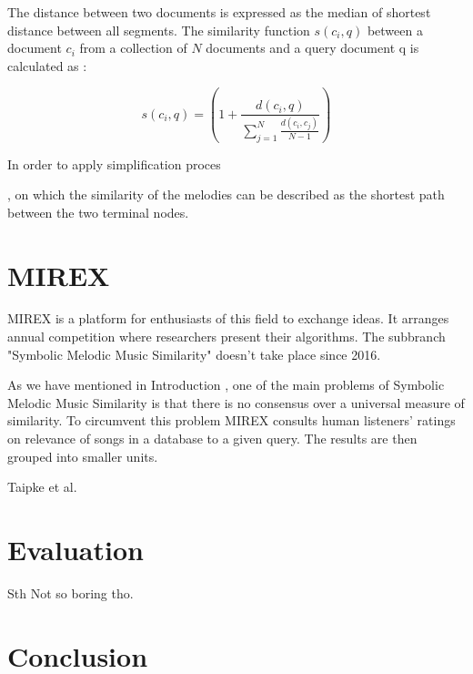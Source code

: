 \documentclass{llncs}
\begin{document}
		The distance between two documents is expressed as the median of shortest distance between all segments. The similarity function $s(c_i , q)$ between a document $c_i$ from a collection of $N$ documents and a query document q is calculated as :
		
		\begin{equation}
			s(c_i , q)= (1 + \frac{d(c_i , q)}{\sum_{j=1}^{N} \frac{d(c_i,c_j)}{N-1}}) 
		\end{equation}

		In order to apply simplification proces 



		, on which the similarity of the melodies can be described as the shortest path between the two terminal nodes.
		
	\section{MIREX}
		MIREX is a platform for enthusiasts of this field to exchange ideas. It arranges annual competition where researchers present their algorithms. The subbranch "Symbolic Melodic Music Similarity" doesn't take place since 2016. 


		As we have mentioned in Introduction , one of the main problems of Symbolic Melodic Music Similarity is that there is no consensus over a universal measure of similarity. To circumvent this problem MIREX consults human listeners' ratings on relevance of songs in a database to a given query. The results are then grouped into smaller units. 

		Taipke et al.  






	\section{Evaluation}
		Sth Not so boring tho.

	\section{Conclusion}

	
\end{document}
